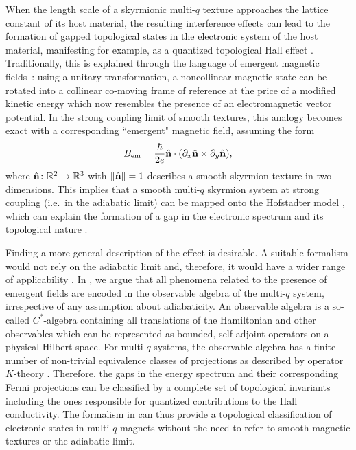\documentclass[submission, Phys]{SciPost}
\begin{document}
When the length scale of a skyrmionic multi-$q$ texture approaches the lattice constant of its host material, the resulting interference effects can lead to the formation of gapped topological states in the electronic system of the host material, manifesting for example, as a quantized topological Hall effect \cite{Hamamoto2015}.
Traditionally, this is explained through the language of emergent magnetic fields~\cite{Bruno2004, Fujita2011, Everschor2014}: using a unitary transformation, a noncollinear magnetic state can be rotated into a collinear co-moving frame of reference at the price of a modified kinetic energy which now resembles the presence of an electromagnetic vector potential. 
In the strong coupling limit of smooth textures, this analogy becomes exact with a corresponding ``emergent" magnetic field, assuming the form 
\begin{align}
    B_{\mathrm{em}} = \frac{\hbar}{2e} 
    \hat{\mathbf{n}} \cdot (\partial_x \hat{\mathbf{n}} \times \partial_y \hat{\mathbf{n}}),
\end{align}
where $\hat{\mathbf{n}} \colon \mathbb{R}^2\to \mathbb{R}^3$ with $\| \hat{\mathbf{n}} \| = 1$ describes a smooth skyrmion texture in two dimensions.
This implies that a smooth multi-$q$ skyrmion system at strong coupling (i.e.~in the adiabatic limit) can be mapped onto the Hofstadter model \cite{Hofstadter1976},
which can explain the formation of a gap in the electronic spectrum and its topological nature \cite{Hamamoto2015, Thouless1982}.

Finding a more general description of the effect is desirable. 
A suitable formalism would not rely on the adiabatic limit and, therefore, it would have a wider range of applicability \cite{Matsui2021}.
In \cite{Lux2024}, we argue that all phenomena related to the presence of emergent fields are encoded in the observable algebra of the multi-$q$ system, irrespective of any assumption about adiabaticity.
An observable algebra is a so-called $C^\ast$-algebra \cite{Murphy1990} containing all translations of the Hamiltonian and other observables which can be represented as bounded, self-adjoint operators on a physical Hilbert space.
For multi-$q$ systems, the observable algebra has a finite number of non-trivial equivalence classes of projections as described by operator $K$-theory \cite{Rordam2000}. 
Therefore, the gaps in the energy spectrum and their corresponding Fermi projections can be classified by a complete set of topological invariants including the ones responsible for quantized contributions to the Hall conductivity.
The formalism in \cite{Lux2024} can thus provide a topological classification of electronic states in multi-$q$ magnets without the need to refer to smooth magnetic textures or the adiabatic limit.
\end{document}
